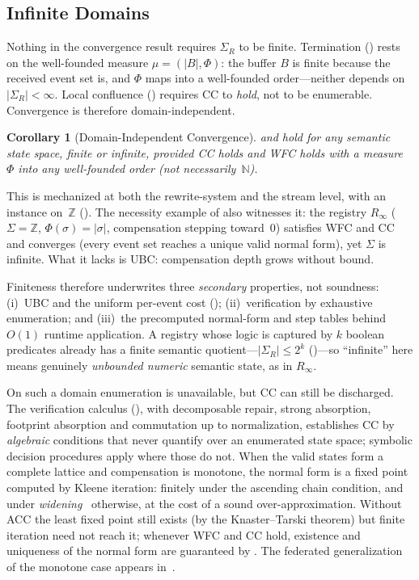 \documentclass[11pt,a4paper]{article}
\theoremstyle{plain}
\newtheorem{corollary}[theorem]{Corollary}
\theoremstyle{definition}
\theoremstyle{remark}
\begin{document}
\subsection{Infinite Domains}
\label{sec:infinite}

Nothing in the convergence result requires $\Sigma_R$ to be finite.  Termination
() rests on the well-founded measure $\mu = (|B|, \Phi)$:
the buffer $B$ is finite because the received event set is, and $\Phi$ maps into
a well-founded order---neither depends on $|\Sigma_R| < \infty$.  Local
confluence () requires CC to \emph{hold}, not to be
enumerable.  Convergence is therefore domain-independent.

\begin{corollary}[Domain-Independent Convergence]
\label{cor:infinite}
 and  hold for any semantic state
space, finite or infinite, provided CC holds and WFC holds with a measure
$\Phi$ into any well-founded order (not necessarily~$\mathbb{N}$).
\end{corollary}

This is mechanized at both the rewrite-system and the stream level, with an
instance on~$\mathbb{Z}$ ().  The necessity example of
 also witnesses it: the registry $R_\infty$
($\Sigma = \mathbb{Z}$, $\Phi(\sigma) = |\sigma|$, compensation stepping
toward~$0$) satisfies WFC and CC and converges (every event set reaches a
unique valid normal form), yet $\Sigma$ is infinite.  What it lacks is UBC:
compensation depth grows without bound.

Finiteness therefore underwrites three \emph{secondary} properties, not
soundness: (i)~UBC and the uniform per-event cost ();
(ii)~verification by exhaustive enumeration; and (iii)~the precomputed
normal-form and step tables behind $O(1)$ runtime application.  A registry whose
logic is captured by $k$ boolean predicates already has a finite semantic
quotient---$|\Sigma_R| \le 2^k$ ()---so ``infinite'' here means
genuinely \emph{unbounded numeric} semantic state, as in $R_\infty$.

On such a domain enumeration is unavailable, but CC can still be discharged.
The verification calculus (), with decomposable repair,
strong absorption, footprint absorption and commutation up to normalization,
establishes CC by \emph{algebraic} conditions that never quantify over an
enumerated state space; symbolic decision procedures apply where those do
not.  When the valid states form a complete lattice and compensation is
monotone, the normal form is a fixed point computed by Kleene iteration:
finitely under the ascending chain condition, and under
\emph{widening}~\cite{cousot1977} otherwise, at the cost of a sound
over-approximation.  Without ACC the least fixed point still exists (by the
Knaster--Tarski theorem) but finite iteration need not reach it; whenever WFC
and CC hold, existence and uniqueness of the normal form are guaranteed by
.
The federated generalization of the monotone case
appears in~\cite{blackwell2026federated}.
\end{document}
